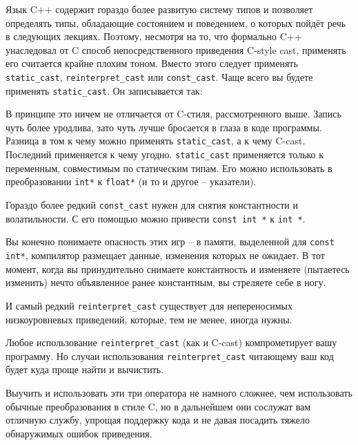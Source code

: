 \documentclass[a4paper,12pt,oneside]{article}
\begin{document}
Язык C++ содержит гораздо более развитую систему типов и позволяет определять типы, обладающие состоянием и поведением, о которых пойдёт речь в следующих лекциях. Поэтому, несмотря на то, что формально C++ унаследовал от C способ непосредственного приведения C-style cast, применять его считается крайне плохим тоном. Вместо этого следует применять \lstinline!static_cast!, \lstinline!reinterpret_cast! или \lstinline!const_cast!. Чаще всего вы будете применять \lstinline!static_cast!. Он записывается так:



В принципе это ничем не отличается от C-стиля, рассмотренного выше. Запись чуть более уродлива, зато чуть лучше бросается в глаза в коде программы. Разница в том к чему можно применять \lstinline!static_cast!, а к чему C-cast. Последний применяется к чему угодно. \lstinline!static_cast! применяется только к переменным, совместимым по статическим типам. Его можно использовать в преобразовании \lstinline!int*! к \lstinline!float*! (и то и другое – указатели). 

Гораздо более редкий \lstinline!const_cast! нужен для снятия константности и волатильности. С его помощью можно привести \lstinline!const int *! к \lstinline!int *!. 



Вы конечно понимаете опасность этих игр – в памяти, выделенной для \lstinline!const int*!, компилятор размещает данные, изменения которых не ожидает. В тот момент, когда вы принудительно снимаете константность и изменяете (пытаетесь изменить) нечто объявленное ранее константным, вы стреляете себе в ногу.

И самый редкий \lstinline!reinterpret_cast! существует для непереносимых низкоуровневых приведений, которые, тем не менее, иногда нужны.



Любое использование \lstinline!reinterpret_cast! (как и C-cast) компрометирует вашу программу. Но случаи использования \lstinline!reinterpret_cast! читающему ваш код будет куда проще найти и вычистить.

Выучить и использовать эти три оператора не намного сложнее, чем использовать обычные преобразования в стиле C, но в дальнейшем они сослужат вам отличную службу, упрощая поддержку кода и не давая посадить тяжело обнаружимых ошибок приведения.
\end{document}
